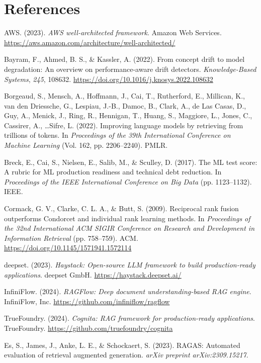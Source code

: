 \chapter*{References}

{\raggedright
\setlength{\parskip}{8pt}
\everypar{\hangindent=0.5in}

AWS. (2023). \textit{AWS well-architected framework}. Amazon Web Services. \url{https://aws.amazon.com/architecture/well-architected/}

Bayram, F., Ahmed, B. S., \& Kassler, A. (2022). From concept drift to model degradation: An overview on performance-aware drift detectors. \textit{Knowledge-Based Systems}, \textit{245}, 108632. \url{https://doi.org/10.1016/j.knosys.2022.108632}

Borgeaud, S., Mensch, A., Hoffmann, J., Cai, T., Rutherford, E., Millican, K., van den Driessche, G., Lespiau, J.-B., Damoc, B., Clark, A., de Las Casas, D., Guy, A., Menick, J., Ring, R., Hennigan, T., Huang, S., Maggiore, L., Jones, C., Cassirer, A., \ldots Sifre, L. (2022). Improving language models by retrieving from trillions of tokens. In \textit{Proceedings of the 39th International Conference on Machine Learning} (Vol. 162, pp. 2206--2240). PMLR.

Breck, E., Cai, S., Nielsen, E., Salib, M., \& Sculley, D. (2017). The ML test score: A rubric for ML production readiness and technical debt reduction. In \textit{Proceedings of the IEEE International Conference on Big Data} (pp. 1123--1132). IEEE.

Cormack, G. V., Clarke, C. L. A., \& Butt, S. (2009). Reciprocal rank fusion outperforms Condorcet and individual rank learning methods. In \textit{Proceedings of the 32nd International ACM SIGIR Conference on Research and Development in Information Retrieval} (pp. 758--759). ACM. \url{https://doi.org/10.1145/1571941.1572114}

deepset. (2023). \textit{Haystack: Open-source LLM framework to build production-ready applications}. deepset GmbH. \url{https://haystack.deepset.ai/}

InfiniFlow. (2024). \textit{RAGFlow: Deep document understanding-based RAG engine}. InfiniFlow, Inc. \url{https://github.com/infiniflow/ragflow}

TrueFoundry. (2024). \textit{Cognita: RAG framework for production-ready applications}. TrueFoundry. \url{https://github.com/truefoundry/cognita}

Es, S., James, J., Anke, L. E., \& Schockaert, S. (2023). RAGAS: Automated evaluation of retrieval augmented generation. \textit{arXiv preprint arXiv:2309.15217}.

}
